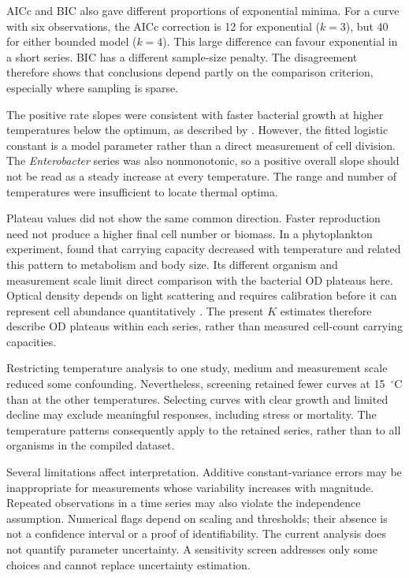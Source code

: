 \documentclass[11pt,a4paper]{article}
\begin{document}
AICc and BIC also gave different proportions of exponential minima. For a curve with six observations, the AICc correction is 12 for exponential ($k=3$), but 40 for either bounded model ($k=4$). This large difference can favour exponential in a short series. BIC has a different sample-size penalty. The disagreement therefore shows that conclusions depend partly on the comparison criterion, especially where sampling is sparse.

The positive rate slopes were consistent with faster bacterial growth at higher temperatures below the optimum, as described by \citet{Ratkowsky1982}. However, the fitted logistic constant is a model parameter rather than a direct measurement of cell division. The \textit{Enterobacter} series was also nonmonotonic, so a positive overall slope should not be read as a steady increase at every temperature. The range and number of temperatures were insufficient to locate thermal optima.

Plateau values did not show the same common direction. Faster reproduction need not produce a higher final cell number or biomass. In a phytoplankton experiment, \citet{Bernhardt2018} found that carrying capacity decreased with temperature and related this pattern to metabolism and body size. Its different organism and measurement scale limit direct comparison with the bacterial OD plateaus here. Optical density depends on light scattering and requires calibration before it can represent cell abundance quantitatively \citep{Stevenson2016}. The present $K$ estimates therefore describe OD plateaus within each series, rather than measured cell-count carrying capacities.

Restricting temperature analysis to one study, medium and measurement scale reduced some confounding. Nevertheless, screening retained fewer curves at 15~$^\circ$C than at the other temperatures. Selecting curves with clear growth and limited decline may exclude meaningful responses, including stress or mortality. The temperature patterns consequently apply to the retained series, rather than to all organisms in the compiled dataset.

Several limitations affect interpretation. Additive constant-variance errors may be inappropriate for measurements whose variability increases with magnitude. Repeated observations in a time series may also violate the independence assumption. Numerical flags depend on scaling and thresholds; their absence is not a confidence interval or a proof of identifiability. The current analysis does not quantify parameter uncertainty. A sensitivity screen addresses only some choices and cannot replace uncertainty estimation.
\end{document}

